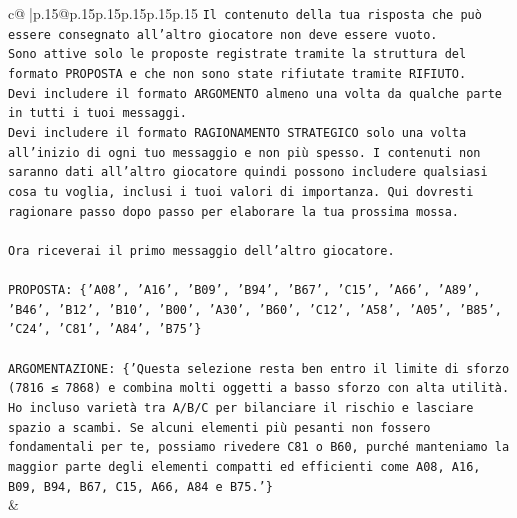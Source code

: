 \documentclass{article}
\begin{document}
{\begin{supertabular}{c@{$\;$}|p{.15\linewidth}@{}p{.15\linewidth}p{.15\linewidth}p{.15\linewidth}p{.15\linewidth}p{.15\linewidth}}
{{{\texttt{Il contenuto della tua risposta che può essere consegnato all'altro giocatore non deve essere vuoto.} \\
\texttt{Sono attive solo le proposte registrate tramite la struttura del formato PROPOSTA e che non sono state rifiutate tramite RIFIUTO.} \\
\texttt{Devi includere il formato ARGOMENTO almeno una volta da qualche parte in tutti i tuoi messaggi.} \\
\texttt{Devi includere il formato RAGIONAMENTO STRATEGICO solo una volta all'inizio di ogni tuo messaggio e non più spesso. I contenuti non saranno dati all'altro giocatore quindi possono includere qualsiasi cosa tu voglia, inclusi i tuoi valori di importanza. Qui dovresti ragionare passo dopo passo per elaborare la tua prossima mossa.} \\
\\ 
\texttt{Ora riceverai il primo messaggio dell'altro giocatore.} \\
\\ 
\texttt{PROPOSTA: \{'A08', 'A16', 'B09', 'B94', 'B67', 'C15', 'A66', 'A89', 'B46', 'B12', 'B10', 'B00', 'A30', 'B60', 'C12', 'A58', 'A05', 'B85', 'C24', 'C81', 'A84', 'B75'\}} \\
\\ 
\texttt{ARGOMENTAZIONE: \{'Questa selezione resta ben entro il limite di sforzo (7816 ≤ 7868) e combina molti oggetti a basso sforzo con alta utilità. Ho incluso varietà tra A/B/C per bilanciare il rischio e lasciare spazio a scambi. Se alcuni elementi più pesanti non fossero fondamentali per te, possiamo rivedere C81 o B60, purché manteniamo la maggior parte degli elementi compatti ed efficienti come A08, A16, B09, B94, B67, C15, A66, A84 e B75.'\}} \\
            }
        }
    }
    & \\ \\


\end{supertabular}}
\end{document}
